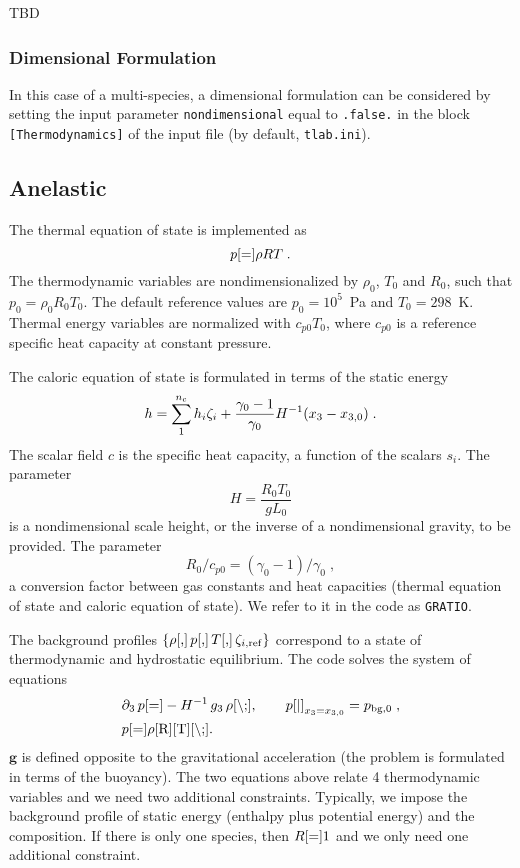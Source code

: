 TBD

\subsubsection{Dimensional Formulation}

In this case of a multi-species, a dimensional formulation can be considered by setting the input parameter \texttt{nondimensional} equal to \texttt{.false.} in the block \texttt{[Thermodynamics]} of the input file (by default, \texttt{tlab.ini}). 

\subsection{Anelastic}
The thermal equation of state is implemented as
\begin{equation}
    p\ref = \rho R T \;.
\end{equation}
The thermodynamic variables are nondimensionalized by $\rho_0$, $T_0$ and $R_0$, such that $p_0=\rho_0R_0T_0$. The default reference values are $p_0=10^5$~Pa and $T_0=298$~K. Thermal energy variables are normalized with $c_{p0}T_0$, where $c_{p0}$ is a reference specific heat capacity at constant pressure.

The caloric equation of state is formulated in terms of the static energy
\begin{equation}
    h =\sum^{n\sc}_1 h_{i} \zeta_i + \frac{\gamma_0-1}{\gamma_0}H^{-1}(x_3-x_{3,0}) \;.
\end{equation}
The scalar field $c$ is the specific heat capacity, a function of the scalars $s_i$. The parameter
\begin{equation}
    H = \frac{R_0T_0}{gL_0}
\end{equation}
is a nondimensional scale height, or the inverse of a nondimensional gravity, to be provided. The parameter
\begin{equation}
    R_0/c_{p0} =(\gamma_0-1)/\gamma_0 \;,
\end{equation}
a conversion factor between gas constants and heat capacities (thermal equation of state and caloric equation of state). We refer to it in the code as \texttt{GRATIO}. 

The background profiles $\{\rho\ref,\, p\ref,\, T\ref,\, \zeta_{i,\mathrm{ref}}\}$ correspond to a state of thermodynamic and hydrostatic equilibrium. The code solves the system of equations
\begin{subequations}
    \begin{align}
        &\partial_3\,p\ref=-H^{-1}\, g_3\,\rho\ref\;,\qquad p\ref|_{x_3=x_{3,0}}=p_{\mathrm{bg},0}\;,\\
        &p\ref  = \rho\ref R\ref T\ref \;.
    \end{align}
\end{subequations}
$\mathbf{g}$ is defined opposite to the gravitational acceleration (the problem is formulated in terms of the buoyancy). The two equations above relate 4 thermodynamic variables and we need two additional constraints. Typically, we impose the background profile of static energy (enthalpy plus potential energy) and the composition. If there is only one species, then $R\ref=1$ and we only need one additional constraint. 


